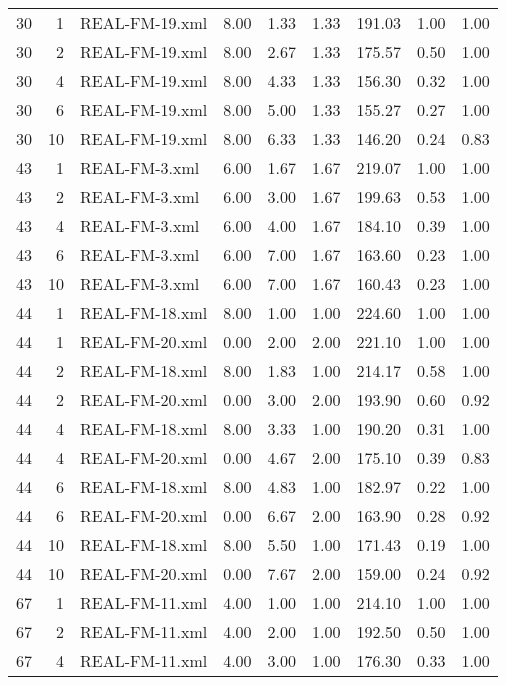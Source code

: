 \begin{table}[ht]
\begin{tabular}{rrlrrrrrr}
   30 &   1 & REAL-FM-19.xml & 8.00 & 1.33 & 1.33 & 191.03 & 1.00 & 1.00 \\ 
   30 &   2 & REAL-FM-19.xml & 8.00 & 2.67 & 1.33 & 175.57 & 0.50 & 1.00 \\ 
   30 &   4 & REAL-FM-19.xml & 8.00 & 4.33 & 1.33 & 156.30 & 0.32 & 1.00 \\ 
   30 &   6 & REAL-FM-19.xml & 8.00 & 5.00 & 1.33 & 155.27 & 0.27 & 1.00 \\ 
   30 &  10 & REAL-FM-19.xml & 8.00 & 6.33 & 1.33 & 146.20 & 0.24 & 0.83 \\ 
   43 &   1 & REAL-FM-3.xml & 6.00 & 1.67 & 1.67 & 219.07 & 1.00 & 1.00 \\ 
   43 &   2 & REAL-FM-3.xml & 6.00 & 3.00 & 1.67 & 199.63 & 0.53 & 1.00 \\ 
   43 &   4 & REAL-FM-3.xml & 6.00 & 4.00 & 1.67 & 184.10 & 0.39 & 1.00 \\ 
   43 &   6 & REAL-FM-3.xml & 6.00 & 7.00 & 1.67 & 163.60 & 0.23 & 1.00 \\ 
   43 &  10 & REAL-FM-3.xml & 6.00 & 7.00 & 1.67 & 160.43 & 0.23 & 1.00 \\ 
   44 &   1 & REAL-FM-18.xml & 8.00 & 1.00 & 1.00 & 224.60 & 1.00 & 1.00 \\ 
   44 &   1 & REAL-FM-20.xml & 0.00 & 2.00 & 2.00 & 221.10 & 1.00 & 1.00 \\ 
   44 &   2 & REAL-FM-18.xml & 8.00 & 1.83 & 1.00 & 214.17 & 0.58 & 1.00 \\ 
   44 &   2 & REAL-FM-20.xml & 0.00 & 3.00 & 2.00 & 193.90 & 0.60 & 0.92 \\ 
   44 &   4 & REAL-FM-18.xml & 8.00 & 3.33 & 1.00 & 190.20 & 0.31 & 1.00 \\ 
   44 &   4 & REAL-FM-20.xml & 0.00 & 4.67 & 2.00 & 175.10 & 0.39 & 0.83 \\ 
   44 &   6 & REAL-FM-18.xml & 8.00 & 4.83 & 1.00 & 182.97 & 0.22 & 1.00 \\ 
   44 &   6 & REAL-FM-20.xml & 0.00 & 6.67 & 2.00 & 163.90 & 0.28 & 0.92 \\ 
   44 &  10 & REAL-FM-18.xml & 8.00 & 5.50 & 1.00 & 171.43 & 0.19 & 1.00 \\ 
   44 &  10 & REAL-FM-20.xml & 0.00 & 7.67 & 2.00 & 159.00 & 0.24 & 0.92 \\ 
   67 &   1 & REAL-FM-11.xml & 4.00 & 1.00 & 1.00 & 214.10 & 1.00 & 1.00 \\ 
   67 &   2 & REAL-FM-11.xml & 4.00 & 2.00 & 1.00 & 192.50 & 0.50 & 1.00 \\ 
   67 &   4 & REAL-FM-11.xml & 4.00 & 3.00 & 1.00 & 176.30 & 0.33 & 1.00 \\ 

\end{tabular}
\end{table}
